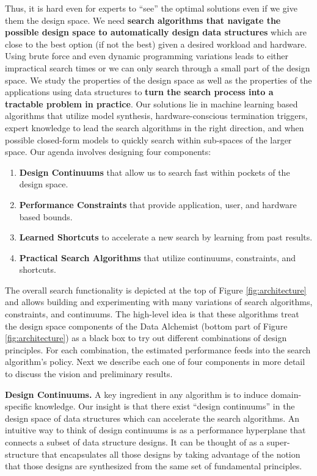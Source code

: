 \documentclass[11pt]{article}
\begin{document}
 Thus, it is hard even for experts to ``see'' the optimal solutions even if we give them the design space.  We need \textbf{search algorithms that navigate the possible design space to automatically design data structures} which are close to the best option (if not the best) given a desired workload and hardware. Using brute force and even dynamic programming variations leads to either impractical search times or we can only search through a small part of the design space. We study the properties of the design space as well as the properties of the applications using data structures to \textbf{turn the search process into a tractable problem in practice}. Our solutions lie in  machine learning based algorithms that utilize model synthesis, hardware-conscious termination triggers, expert knowledge to lead the search algorithms in the right direction, and when possible closed-form models to quickly search within sub-spaces of the larger space. Our agenda involves designing four components:

\begin{enumerate} 
	\item \textbf{Design Continuums} that allow us to search fast within pockets of the design space.
	\vspace{-.5em}
	\item \textbf{Performance Constraints} that provide application, user, and hardware based bounds. 
	\vspace{-.5em}
	\item \textbf{Learned Shortcuts} to accelerate a new search by learning from past results.
	\vspace{-.5em}
	\item \textbf{Practical Search Algorithms} that utilize continuums, constraints, and shortcuts.
\end{enumerate} 

 The overall search functionality is depicted at the top of Figure \ref{fig:architecture} and allows building and experimenting with many variations of search algorithms, constraints, and continuums. The high-level idea is that these algorithms treat the design space components of the Data Alchemist (bottom part of Figure \ref{fig:architecture}) as a black box to try out different combinations of design principles. For each combination, the estimated performance feeds into the search algorithm's policy. Next we describe each one of four components in more detail to discuss the vision and preliminary results. 

\textbf{Design Continuums.}
A key ingredient in any algorithm is to induce domain-specific knowledge. Our insight is that there exist ``design continuums''  in the design space of data structures which can accelerate the search algorithms. An intuitive way to think of design continuums is as a performance hyperplane that connects a subset of data structure designs. It can be thought of as a super-structure that encapsulates all those designs by taking advantage of the notion that those designs are synthesized from the same set of fundamental principles. 
\end{document}
